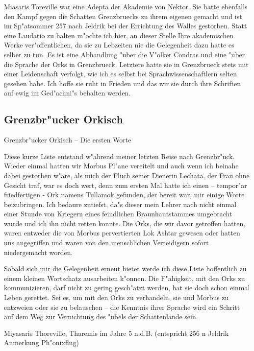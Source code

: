 \documentclass[a5paper,8pt]{book}
\begin{document}
Miasaris Toreville war eine Adepta der Akademie von Nektor. Sie hatte ebenfalls den Kampf gegen die Schatten Grenzbruecks zu ihrem eigenen gemacht und ist im Sp"atsommer 257 nach Jeldrik bei der Errichtung des Walles gestorben.
Statt eine Laudatio zu halten m"ochte ich hier, an dieser Stelle Ihre akademischen Werke ver"offentlichen, da sie zu Lebzeiten nie die Gelegenheit dazu hatte es selber zu tun. Es ist eine Abhandlung "uber die V"olker Condras und eine "uber die Sprache der Orks in Grenzbrueck. Letztere hatte sie in Grenzbrueck stets mit einer Leidenschaft verfolgt, wie ich es selbst bei Sprachwissenschaftlern selten gesehen habe. Ich hoffe sie ruht in Frieden und das wir sie durch ihre Schriften auf ewig im Ged"achni"s behalten werden.

\newpage

\subsection{Grenzbr"ucker Orkisch}

Grenzbr"ucker Orkisch – Die ersten Worte

Diese kurze Liste entstand w"ahrend meiner letzten Reise nach Grenzbr"uck. Wieder einmal hatten wir Morbus Pl"ane vereitelt und auch wenn ich beinahe dabei gestorben w"are, als mich der Fluch seiner Dienerin Lechata, der Frau ohne Gesicht traf, war es doch wert, denn zum ersten Mal hatte ich einen – tempor"ar friedfertigen - Ork namens Tullamok gefunden, der bereit war, mir einige Worte beizubringen. Ich bedaure zutiefst, da"s dieser mein Lehrer nach nicht einmal einer Stunde von Kriegern eines feindlichen Braunhautstammes umgebracht wurde und ich ihn nicht retten konnte. Die Orks, die wir davor getroffen hatten, waren entweder die von Morbus pervertierten Lok Ashtar gewesen oder hatten uns angegriffen und waren von den menschlichen Verteidigern sofort niedergemacht worden. 

Sobald sich mir die Gelegenheit erneut bietet werde ich diese Liste hoffentlich zu einem kleinen Wortschatz ausarbeiten k"onnen. Die F"ahigkeit, mit den Orks zu kommunizieren, darf nicht zu gering gesch"atzt werden, hat sie doch schon einmal Leben gerettet. Sei es, um mit den Orks zu verhandeln, sie und Morbus zu entzweien oder sie zu belauschen – die Kenntnis  ihrer Sprache wird ein Schritt auf dem Weg zur Vernichtung des "ubels der Schattenlande sein.

Miyasaris Thoreville, Tharemis im Jahre 5 n.d.B. (entspricht 256 n Jeldrik Anmerkung Ph"onixflug)
\end{document}
